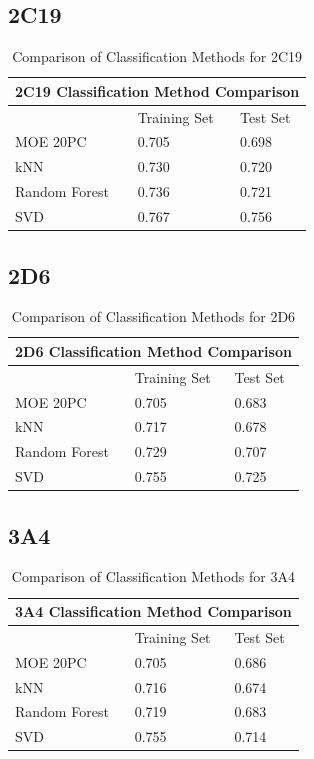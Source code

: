 \subsection{2C19}

\begin{table}[h]
\begin{tabular}{|l|l|l|}
\hline
\multicolumn{3}{|c|}{2C19 Classification Method Comparison} \\ \hline
          & Training Set & Test Set \\ \hline
MOE 20PC  & 0.705        & 0.698    \\ \hline
kNN       & 0.730        & 0.720    \\ \hline
Random Forest & 0.736    & 0.721    \\ \hline
SVD       & 0.767        & 0.756    \\ \hline
\end{tabular}
\caption{Comparison of Classification Methods for 2C19}
\end{table}

\subsection{2D6}

\begin{table}[h]
\begin{tabular}{|l|l|l|}
\hline
\multicolumn{3}{|c|}{2D6 Classification Method Comparison} \\ \hline
          & Training Set & Test Set \\ \hline
MOE 20PC  & 0.705        & 0.683    \\ \hline
kNN       & 0.717        & 0.678    \\ \hline
Random Forest & 0.729    & 0.707    \\ \hline
SVD       & 0.755        & 0.725    \\ \hline
\end{tabular}
\caption{Comparison of Classification Methods for 2D6}
\end{table}

\subsection{3A4}

\begin{table}[h]
\begin{tabular}{|l|l|l|}
\hline
\multicolumn{3}{|c|}{3A4 Classification Method Comparison} \\ \hline
          & Training Set & Test Set \\ \hline
MOE 20PC  & 0.705        & 0.686    \\ \hline
kNN       & 0.716        & 0.674    \\ \hline
Random Forest & 0.719    & 0.683    \\ \hline
SVD       & 0.755        & 0.714    \\ \hline
\end{tabular}
\caption{Comparison of Classification Methods for 3A4}
\end{table}

